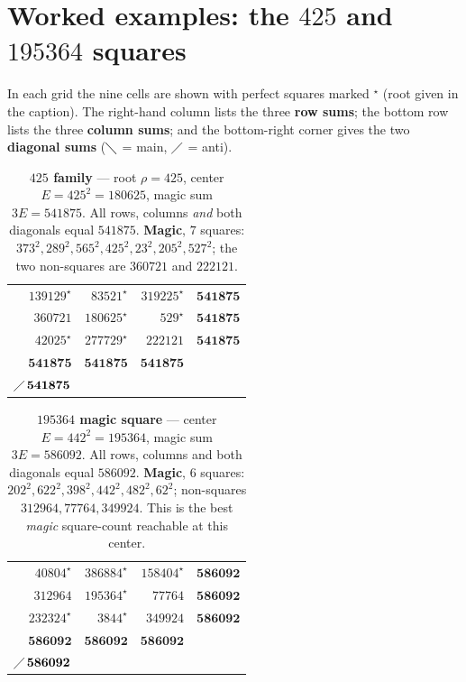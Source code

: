 \documentclass[11pt]{article}
\begin{document}
\section{Worked examples: the $425$ and $195364$ squares}

In each grid the nine cells are shown with perfect squares marked $^\star$ (root
given in the caption). The right-hand column lists the three \textbf{row sums};
the bottom row lists the three \textbf{column sums}; and the bottom-right corner
gives the two \textbf{diagonal sums} ($\diagdown$ = main, $\diagup$ = anti).

\begin{table}[h]
\centering
\begin{tabular}{|rrr||r|}
\hline
$139129^\star$ & $83521^\star$ & $319225^\star$ & $\mathbf{541875}$\\
$360721$ & $180625^\star$ & $529^\star$ & $\mathbf{541875}$\\
$42025^\star$ & $277729^\star$ & $222121$ & $\mathbf{541875}$\\
\hline\hline
$\mathbf{541875}$ & $\mathbf{541875}$ & $\mathbf{541875}$
   & \shortstack{$\diagdown\,\mathbf{541875}$\\[2pt]$\diagup\,\mathbf{541875}$}\\
\hline
\end{tabular}
\caption{\textbf{$425$ family} --- root $\rho=425$, center $E=425^2=180625$, magic
sum $3E=541875$. All rows, columns \emph{and} both diagonals equal $541875$.
\textbf{Magic}, $7$ squares: $373^2,289^2,565^2,425^2,23^2,205^2,527^2$; the two
non-squares are $360721$ and $222121$.}
\end{table}

\begin{table}[h]
\centering
\begin{tabular}{|rrr||r|}
\hline
$40804^\star$ & $386884^\star$ & $158404^\star$ & $\mathbf{586092}$\\
$312964$ & $195364^\star$ & $77764$ & $\mathbf{586092}$\\
$232324^\star$ & $3844^\star$ & $349924$ & $\mathbf{586092}$\\
\hline\hline
$\mathbf{586092}$ & $\mathbf{586092}$ & $\mathbf{586092}$
   & \shortstack{$\diagdown\,\mathbf{586092}$\\[2pt]$\diagup\,\mathbf{586092}$}\\
\hline
\end{tabular}
\caption{\textbf{$195364$ magic square} --- center $E=442^2=195364$, magic sum
$3E=586092$. All rows, columns and both diagonals equal $586092$. \textbf{Magic},
$6$ squares:
$202^2,622^2,398^2,442^2,482^2,62^2$; non-squares $312964,77764,349924$. This is the
best \emph{magic} square-count reachable at this center.}
\end{table}
\end{document}

